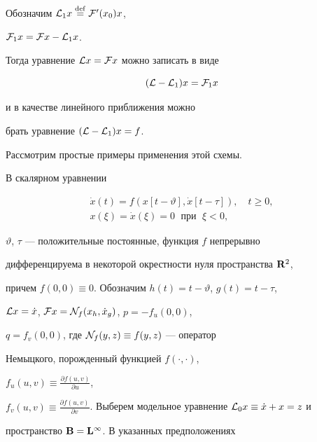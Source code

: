 Обозначим ${\cal L}_1x\overset{\mathrm{def}}{=}{}{\cal F}'(x_0)x$,


${\cal F}_1x={\cal F}x-{\cal L}_1x$.


Тогда уравнение ${\cal L}x={\cal F}x$ можно записать в виде


$$


({\cal L}-{\cal L}_1)x={\cal F}_1x


$$


и в качестве линейного приближения можно


брать уравнение $({\cal L}-{\cal L}_1)x=f$.





Рассмотрим простые примеры применения этой схемы.





\begin{exam}


В скалярном уравнении


\begin{equation}


\begin{array}{c}


\Dot x(t)=f(x[t-\vartheta],\Dot x[t-\tau]),\quad t\ge0,\\[2mm]


x(\xi)=\Dot x(\xi)=0\; \text{ при }\; \xi<0,


\end{array}


\end{equation}


$\vartheta$, $\tau$ --- положительные постоянные, функция $f$ непрерывно


дифференцируема в некоторой окрестности нуля пространства $\bold {R}^2$,


причем $f(0,0)\equiv0$. Обозначим $h(t)=t-\vartheta$, $g(t)=t-\tau$,


${\cal L}x=\Dot x$, ${\cal F}x={\cal N}_f(x_h,\Dot x_g)$, $p=-f_u(0,0)$,


$q=f_v(0,0)$, где ${\cal N}_f(y,z)\equiv f(y,z)$ --- оператор


Немыцкого, порожденный функцией $f(\cdot,\cdot)$,


$f_u(u,v)\equiv\frac{\partial f(u,v)}{\partial u}$,


$f_v(u,v)\equiv\frac{\partial f(u,v)}{\partial


v}$. Выберем модельное уравнение ${\cal L}_0x\equiv\Dot x+x=z$ и


пространство $\bold {B}=\bold {L}^{\infty}$. В указанных предположениях



\end{exam}
